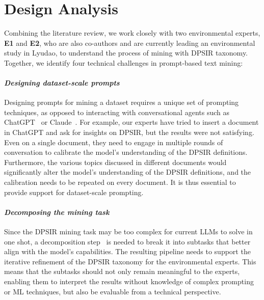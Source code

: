 
\section{Design Analysis}
Combining the literature review, we work closely with two environmental experts, \textbf{E1} and \textbf{E2}, who are also co-authors and are currently leading an environmental study in Lyudao, to understand the process of mining with DPSIR taxonomy. 
Together, we identify four technical challenges in prompt-based text mining:

\paragraph{\textit{Designing dataset-scale prompts}} Designing prompts for mining a dataset requires a unique set of prompting techniques, as opposed to interacting with conversational agents such as ChatGPT~\cite{chatgpt} or Claude~\cite{claude}. For example, our experts have tried to insert a document in ChatGPT and ask for insights on DPSIR, but the results were not satisfying. Even on a single document, they need to engage in multiple rounds of conversation to calibrate the model's understanding of the DPSIR definitions. Furthermore, the various topics discussed in different documents would significantly alter the model's understanding of the DPSIR definitions, and the calibration needs to be repeated on every document. 
It is thus essential to provide support for dataset-scale prompting.

\paragraph{\textit{Decomposing the mining task}} 
Since the DPSIR mining task may be too complex for current LLMs to solve in one shot, a decomposition step~\cite{khot2023decomposed} is needed to break it into subtasks that better align with the model's capabilities. The resulting pipeline needs to support the iterative refinement of the DPSIR taxonomy for the environmental experts. This means that the subtasks should not only remain meaningful to the experts, enabling them to interpret the results without knowledge of complex prompting or ML techniques, but also be evaluable from a technical perspective.

